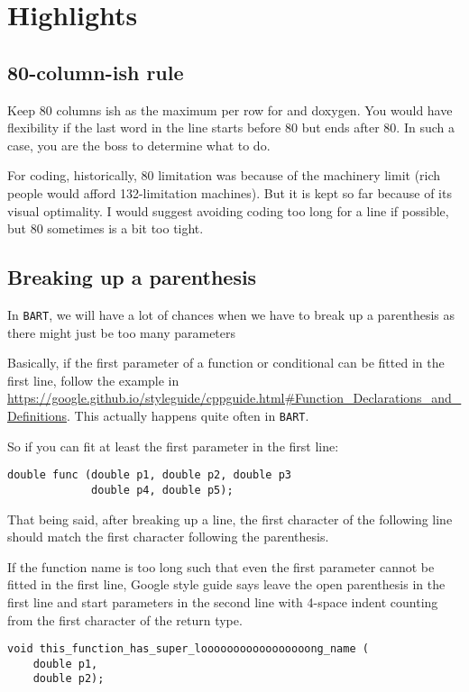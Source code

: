 \documentclass{article}
\newcommand{\bart}{{\tt BART}}
\begin{document}
\section{Highlights}
\subsection{80-column-ish rule}
Keep 80 columns ish as the maximum per row for and doxygen. You would have flexibility if the last word in the line starts before 80 but ends after 80. In such a case, you are the boss to determine what to do.

For coding, historically, 80 limitation was because of the machinery limit (rich people would afford 132-limitation machines). But it is kept so far because of its visual optimality. I would suggest avoiding coding too long for a line if possible, but 80 sometimes is a bit too tight.

\subsection{Breaking up a parenthesis}
In \bart, we will have a lot of chances when we have to break up a parenthesis as there might just be too many parameters

Basically, if the first parameter of a function or conditional can be fitted in the first line, follow the example in \url{https://google.github.io/styleguide/cppguide.html#Function_Declarations_and_Definitions}. This actually happens quite often in \bart.

So if you can fit at least the first parameter in the first line:
\begin{lstlisting}
double func (double p1, double p2, double p3
             double p4, double p5);
\end{lstlisting}
That being said, after breaking up a line, the first character of the following line should match the first character following the parenthesis.

If the function name is too long such that even the first parameter cannot be fitted in the first line, Google style guide says leave the open parenthesis in the first line and start parameters in the second line with 4-space indent counting from the first character of the return type.
\begin{lstlisting}
void this_function_has_super_looooooooooooooooong_name (
    double p1,
    double p2);
\end{lstlisting}
\end{document}
